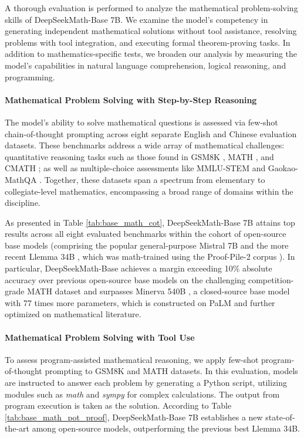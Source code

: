 A thorough evaluation is performed to analyze the mathematical problem-solving skills of DeepSeekMath-Base 7B. We examine the model’s competency in generating independent mathematical solutions without tool assistance, resolving problems with tool integration, and executing formal theorem-proving tasks. In addition to mathematics-specific tests, we broaden our analysis by measuring the model’s capabilities in natural language comprehension, logical reasoning, and programming.

\paragraph{Mathematical Problem Solving with Step-by-Step Reasoning}

The model’s ability to solve mathematical questions is assessed via few-shot chain-of-thought prompting \citep{cot} across eight separate English and Chinese evaluation datasets. These benchmarks address a wide array of mathematical challenges: quantitative reasoning tasks such as those found in GSM8K \citep{gsm8k}, MATH \citep{MATH}, and CMATH \citep{wei2023cmath}; as well as multiple-choice assessments like MMLU-STEM \citep{mmlu} and Gaokao-MathQA \citep{agieval}. Together, these datasets span a spectrum from elementary to collegiate-level mathematics, encompassing a broad range of domains within the discipline.

As presented in Table \ref{tab:base_math_cot}, DeepSeekMath-Base 7B attains top results across all eight evaluated benchmarks within the cohort of open-source base models (comprising the popular general-purpose Mistral 7B \citep{mistral} and the more recent Llemma 34B \citep{llemma}, which was math-trained using the Proof-Pile-2 corpus \citep{llemma}). In particular, DeepSeekMath-Base achieves a margin exceeding 10\% absolute accuracy over previous open-source base models on the challenging competition-grade MATH dataset and surpasses Minerva 540B \citep{minerva}, a closed-source base model with 77 times more parameters, which is constructed on PaLM \citep{palm} and further optimized on mathematical literature.

\paragraph{Mathematical Problem Solving with Tool Use} To assess program-assisted mathematical reasoning, we apply few-shot program-of-thought prompting \citep{pot,pal} to GSM8K and MATH datasets. In this evaluation, models are instructed to answer each problem by generating a Python script, utilizing modules such as \textit{math} and \textit{sympy} for complex calculations. The output from program execution is taken as the solution. According to Table \ref{tab:base_math_pot_proof}, DeepSeekMath-Base 7B establishes a new state-of-the-art among open-source models, outperforming the previous best Llemma 34B.

